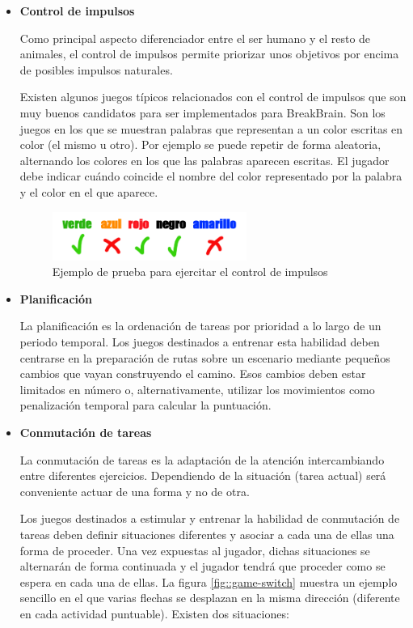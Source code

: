 \begin{itemize}

\item {\bf Control de impulsos}

Como principal aspecto diferenciador entre el ser humano y el resto de animales, el control de impulsos permite priorizar unos objetivos por encima de posibles impulsos naturales.

Existen algunos juegos típicos relacionados con el control de impulsos que son muy buenos candidatos para ser implementados para BreakBrain. Son los juegos en los que se muestran palabras que representan a un color escritas en color (el mismo u otro). Por ejemplo se puede repetir de forma aleatoria, alternando los colores en los que las palabras aparecen escritas. El jugador debe indicar cuándo coincide el nombre del color representado por la palabra y el color en el que aparece.

\begin{figure}[h]
  \begin{center}
    \includegraphics[width=0.6\textwidth]{./images/game-impulse.png}
    \caption{Ejemplo de prueba para ejercitar el control de impulsos}
  \end{center}  
\end{figure}

\item {\bf Planificación}

La planificación es la ordenación de tareas por prioridad a lo largo de un periodo temporal. Los juegos destinados a entrenar esta habilidad deben centrarse en la preparación de rutas sobre un escenario mediante pequeños cambios que vayan construyendo el camino. Esos cambios deben estar limitados en número o, alternativamente, utilizar los movimientos como penalización temporal para calcular la puntuación.

\item {\bf Conmutación de tareas}

La conmutación de tareas es la adaptación de la atención intercambiando entre diferentes ejercicios. Dependiendo de la situación (tarea actual) será conveniente actuar de una forma y no de otra.

Los juegos destinados a estimular y entrenar la habilidad de conmutación de tareas deben definir situaciones diferentes y asociar a cada una de ellas una forma de proceder. Una vez expuestas al jugador, dichas situaciones se alternarán de forma continuada y el jugador tendrá que proceder como se espera en cada una de ellas. La figura \ref{fig::game-switch} muestra un ejemplo sencillo en el que varias flechas se desplazan en la misma dirección (diferente en cada actividad puntuable). Existen dos situaciones:


\end{itemize}
